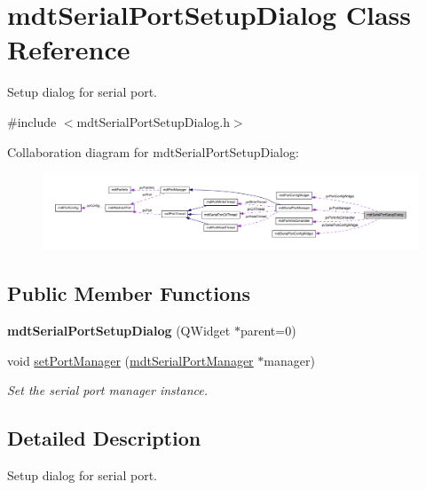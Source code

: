\hypertarget{classmdt_serial_port_setup_dialog}{
\section{mdtSerialPortSetupDialog Class Reference}
\label{classmdt_serial_port_setup_dialog}
}


Setup dialog for serial port.  




{\ttfamily \#include $<$mdtSerialPortSetupDialog.h$>$}



Collaboration diagram for mdtSerialPortSetupDialog:\nopagebreak
\begin{figure}[H]
\begin{center}
\leavevmode
\includegraphics[width=400pt]{classmdt_serial_port_setup_dialog__coll__graph}
\end{center}
\end{figure}
\subsection*{Public Member Functions}
\begin{DoxyCompactItemize}
\item 
\hypertarget{classmdt_serial_port_setup_dialog_acc56166a396bcd666de54ca0f54ad034}{
{\bfseries mdtSerialPortSetupDialog} (QWidget $\ast$parent=0)}
\label{classmdt_serial_port_setup_dialog_acc56166a396bcd666de54ca0f54ad034}

\item 
void \hyperlink{classmdt_serial_port_setup_dialog_a90f315f66728387fb7b4b8d23dba33a8}{setPortManager} (\hyperlink{classmdt_serial_port_manager}{mdtSerialPortManager} $\ast$manager)
\begin{DoxyCompactList}\small\item\em Set the serial port manager instance. \end{DoxyCompactList}\end{DoxyCompactItemize}


\subsection{Detailed Description}
Setup dialog for serial port. 

